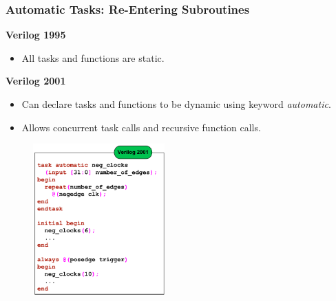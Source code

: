 \documentclass[t, notes, xcolor=table]{beamer}
\begin{document}
\begin{frame}
\frametitle{Automatic Tasks: Re-Entering Subroutines}
\scriptsize{
\begin{multicols}{2}
\textbf{Verilog 1995}
\begin{itemize}
\item All tasks and functions are static.
\end{itemize}

\textbf{Verilog 2001}

\begin{itemize}
\item Can declare tasks and functions to be dynamic using keyword \textit{automatic}.
\item Allows concurrent task calls and recursive function calls.
\end{itemize}
\vfill
\columnbreak
\begin{figure}
    \includegraphics[width=0.45\textwidth]{img/10_task_re_enter.png}
\end{figure}
\end{multicols}
}
\end{frame}
\end{document}
